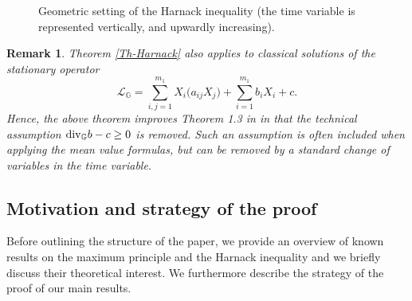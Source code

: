\documentclass[11pt,a4paper]{article}
\newtheorem{remark}[theorem]{\bf Remark}
\numberwithin{equation}{section}
\def \GG {{\mathbb{G}}}
\def \div {{\text{\rm div}}}
\def \O {{\Omega}}
\begin{document}
\begin{figure}\label{figure-harnack}
  \centering


  \caption{Geometric setting of the Harnack inequality (the time variable is represented vertically, and upwardly increasing).}
\end{figure}
\begin{remark}
	Theorem \ref{Th-Harnack} also applies to classical solutions of the stationary operator
	\begin{equation}
		\mathscr{L}_\GG  =\sum_{i,j=1}^{m_1} X_i\big(a_{ij}X_j\big) + \sum_{i=1}^{m_1} b_iX_i+ c.
	\end{equation}
	Hence, the above theorem improves Theorem 1.3 in \cite{pecorella} in that the technical assumption $\div_\GG b - c\geq 0$ is removed.  Such an assumption is often included when applying the mean value formulas, but can be removed by a standard change of variables in the time variable. 
\end{remark}
\subsection{Motivation and strategy of the proof}
Before outlining the structure of the paper, we provide an overview of known results on the maximum principle and the Harnack inequality and we briefly discuss their theoretical interest. We furthermore describe the strategy of the proof of our main results.
\end{document}
